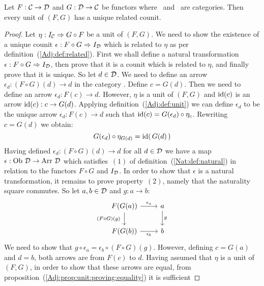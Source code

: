 \begin{prop}\label{Adj:prop:unit:has:related:counit}
    Let $F:\mbox{$\cal C$}\to\mbox{$\cal D$}$ and $G:\mbox{$\cal D$}\to\mbox{$\cal C$}$ be functors where \Cat\ and \Dat\ 
    are categories. Then every unit of $(F,G)$ has a unique related counit.
\end{prop}
\begin{proof}
    Let $\eta:I_{\cal C}\Rightarrow G\circ F$ be a unit of $(F,G)$. We need to 
    show the existence of a unique counit $\epsilon:F\circ G\Rightarrow I_{\cal D}$ 
    which is related to $\eta$ as per definition~(\ref{Adj:def:related}).
    First we shall define a natural transformation $\epsilon:F\circ G\Rightarrow
    I_{\cal D}$, then prove that it is a counit which is related
    to $\eta$, and finally prove that it is unique. So let $d\in\mbox{$\cal D$}$. We need to 
    define an arrow $\epsilon_{d}: (F\circ G)(d)\to d$ in the category \Dat. 
    Define $c=G(d)$. Then we need to define an arrow $\epsilon_{d}:F(c)\to d$. 
    However, $\eta$ is a unit of $(F,G)$ and $\mbox{\rm id}(c)$ is an arrow $\mbox{\rm id}(c):c\to G(d)$. 
    Applying definition~(\ref{Adj:def:unit}) we can define $\epsilon_{d}$ to be
    the unique arrow $\epsilon_{d}:F(c)\to d$ such that $\mbox{\rm id}(c)=G(\epsilon_{d})
    \circ\eta_{c}$. Rewriting $c=G(d)$ we obtain:
        \begin{equation}\label{Adj:eqn:unit:has:related:counit:1}
            G(\epsilon_{d})\circ\eta_{G(d)}=\mbox{\rm id}(\,G(d)\,)
        \end{equation}
    Having defined $\epsilon_{d}:(F\circ G)(d)\to d$ for all $d\in\mbox{$\cal D$}$ we have 
    a map $\epsilon:\mbox{\rm Ob}\ \mbox{$\cal D$}\to\mbox{\rm Arr}\ \mbox{$\cal D$}$ which satisfies~$(1)$ of 
    definition~(\ref{Nat:def:natural}) in relation to the functors $F\circ G$
    and $I_{\cal D}$. In order to show that $\epsilon$ is a natural 
    transformation, it remains to prove property~$(2)$, namely that the 
    naturality square commutes. So let $a,b\in\mbox{$\cal D$}$ and $g:a\to b$:
    \[
        \begin{tikzcd}
            F(G(a))\arrow[r, "\epsilon_{a}"]\arrow[d, swap,"(F\circ G)(g)\ "]
            &a\arrow[d, "g"]
            \\
            F(G(b))\arrow[r, swap, "\epsilon_{b}"]
            &b
        \end{tikzcd}
    \]
    We need to show that $g\circ\epsilon_{a}=\epsilon_{b}\circ(F\circ G)(g)$.
    However, defining $c=G(a)$ and $d=b$, both arrows are from $F(c)$ to $d$.
    Having assumed that $\eta$ is a unit of $(F,G)$, in order to show that
    these arrows are equal, 
    from proposition~(\ref{Adj:prop:unit:proving:equality}) it is sufficient

\end{proof}
